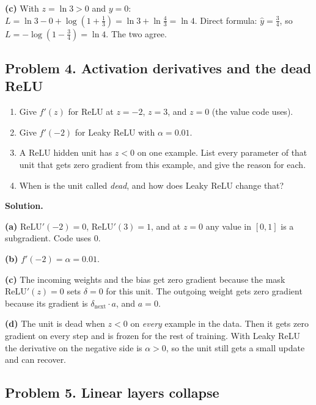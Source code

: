 \textbf{(c)} With $z = \ln 3 > 0$ and $y = 0$: $L = \ln 3 - 0 + \log(1 + \tfrac13) = \ln 3 + \ln\tfrac43 = \ln 4$. Direct formula: $\hat y = \tfrac34$, so $L = -\log(1 - \tfrac34) = \ln 4$. The two agree.

\subsection*{Problem 4. Activation derivatives and the dead ReLU}

\begin{enumerate}[label=(\alph*)]
\item Give $f'(z)$ for ReLU at $z = -2$, $z = 3$, and $z = 0$ (the value code uses).
\item Give $f'(-2)$ for Leaky ReLU with $\alpha = 0.01$.
\item A ReLU hidden unit has $z < 0$ on one example. List every parameter of that unit that gets zero gradient from this example, and give the reason for each.
\item When is the unit called \emph{dead}, and how does Leaky ReLU change that?
\end{enumerate}

\textbf{Solution.}

\textbf{(a)} $\mathrm{ReLU}'(-2) = 0$, $\mathrm{ReLU}'(3) = 1$, and at $z = 0$ any value in $[0,1]$ is a subgradient. Code uses $0$.

\textbf{(b)} $f'(-2) = \alpha = 0.01$.

\textbf{(c)} The incoming weights and the bias get zero gradient because the mask $\mathrm{ReLU}'(z) = 0$ sets $\delta = 0$ for this unit. The outgoing weight gets zero gradient because its gradient is $\delta_{\text{next}}\cdot a$, and $a = 0$.

\textbf{(d)} The unit is dead when $z < 0$ on \emph{every} example in the data. Then it gets zero gradient on every step and is frozen for the rest of training. With Leaky ReLU the derivative on the negative side is $\alpha > 0$, so the unit still gets a small update and can recover.

\subsection*{Problem 5. Linear layers collapse}

